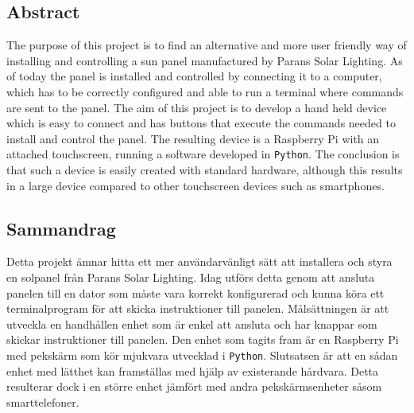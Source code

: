 \documentclass[a4paper]{article}
\begin{document}
    \subsection*{Abstract} %
    \label{sub:abstract}
            The purpose of this project is to find an alternative and more 
            user friendly way of installing and controlling a sun panel 
            manufactured by Parans Solar Lighting. As of today the panel is 
            installed and controlled by connecting it to a computer, 
            which has to be correctly configured and able to run a terminal 
            where commands are sent to the panel. The aim of this project is 
            to develop a hand held device which is easy to connect and has 
            buttons that execute the commands needed to install and control 
            the panel. The resulting device is a Raspberry Pi with an attached
            touchscreen, running a software developed in \texttt{Python}.  
            The conclusion is that such a device is easily created with standard
            hardware, although this results in a large device 
            compared to other touchscreen devices such as smartphones.
            
    \subsection*{Sammandrag} %
    \label{sub:sammandrag}
            Detta projekt ämnar hitta ett mer användarvänligt sätt att
            installera och styra en solpanel från Parans Solar Lighting. Idag
            utförs detta genom att ansluta panelen till en dator som måste vara
            korrekt konfigurerad och kunna köra ett terminalprogram för att
            skicka instruktioner till panelen. Målsättningen är att utveckla en
            handhållen enhet som är enkel att ansluta och har knappar som
            skickar instruktioner till panelen. Den enhet som tagits fram är en
            Raspberry Pi med pekskärm som kör mjukvara utvecklad i
            \texttt{Python}. Slutsatsen är att en sådan enhet med lätthet kan
            framställas med hjälp av existerande hårdvara. Detta resulterar dock
            i en större enhet jämfört med andra pekskärmsenheter såsom
            smarttelefoner.

\end{document}
